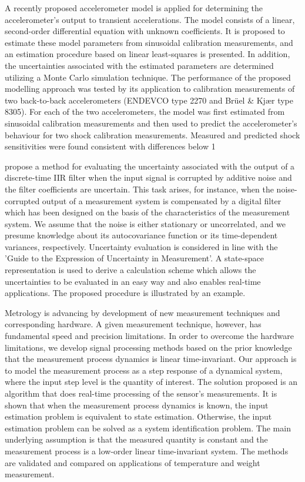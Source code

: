 \documentclass[11pt]{article}
\begin{document}
\citet{Link07} A recently proposed accelerometer model is applied for determining the accelerometer's output to transient accelerations. The model consists of a linear, second-order differential equation with unknown coefficients. It is proposed to estimate these model parameters from sinusoidal calibration measurements, and an estimation procedure based on linear least-squares is presented. In addition, the uncertainties associated with the estimated parameters are determined utilizing a Monte Carlo simulation technique. The performance of the proposed modelling approach was tested by its application to calibration measurements of two back-to-back accelerometers (ENDEVCO type 2270 and Br{\"u}el \& Kj{\ae}r type 8305). For each of the two accelerometers, the model was first estimated from sinusoidal calibration measurements and then used to predict the accelerometer's behaviour for two shock calibration measurements. Measured and predicted shock sensitivities were found consistent with differences below 1%

\citet{Link09} propose a method  for evaluating the uncertainty associated with the output of a discrete-time IIR filter when the input signal is corrupted by additive noise and the filter coefficients are uncertain. This task arises, for instance, when the noise-corrupted output of a measurement system is compensated by a digital filter which has been designed on the basis of the characteristics of the measurement system. We assume that the noise is either stationary or uncorrelated, and we presume knowledge about its autocovariance function or its time-dependent variances, respectively. Uncertainty evaluation is considered in line with the 'Guide to the Expression of Uncertainty in Measurement'. A state-space representation is used to derive a calculation scheme which allows the uncertainties to be evaluated in an easy way and also enables real-time applications. The proposed procedure is illustrated by an example.

\citet{Markovsky15cep} Metrology is advancing by development of new measurement techniques and corresponding hardware. A given measurement technique, however, has fundamental speed and precision limitations. In order to overcome the hardware limitations, we develop signal processing methods based on the prior knowledge that the measurement process dynamics is linear time-invariant.
Our approach is to model the measurement process as a step response of a dynamical system, where the input step level is the quantity of interest. The solution proposed is an algorithm that does real-time processing of the sensor's measurements. It is shown that when the measurement process dynamics is known, the input estimation problem is equivalent to state estimation. Otherwise, the input estimation problem can be solved as a system identification problem. The main underlying assumption is that the measured quantity is constant and the measurement process is a low-order linear time-invariant system. The methods are validated and compared on applications of temperature and weight measurement.
\end{document}
